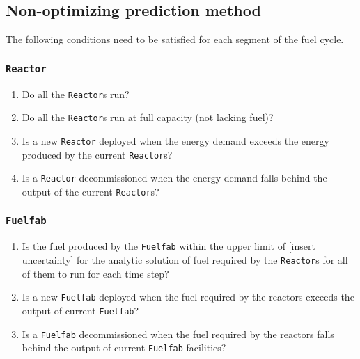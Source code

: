 \documentclass[12pt,letterpaper]{article}
\begin{document}
\subsection{Non-optimizing prediction method}
The following conditions need to be satisfied for each segment of the fuel cycle. 

\subsubsection{\texttt{Reactor}}

\begin{enumerate}
 
\item Do all the \texttt{Reactor}s run? 
\item  Do all the \texttt{Reactor}s run at full capacity (not lacking fuel)? 

\item Is a new \texttt{Reactor} deployed when the energy demand exceeds the energy produced by the current \texttt{Reactor}s? 

\item Is a \texttt{Reactor} decommissioned when the energy demand falls behind the output of the current \texttt{Reactor}s? 

\end{enumerate}

\subsubsection{\texttt{Fuelfab}}
\begin{enumerate}
\item  Is the fuel produced by the \texttt{Fuelfab} within the upper limit of [insert uncertainty] for the analytic solution of fuel required by the \texttt{Reactor}s for all of them to run for each time step? 

\item Is a new \texttt{Fuelfab} deployed when the fuel required by the reactors exceeds the output of current \texttt{Fuelfab}?

\item Is a \texttt{Fuelfab} decommissioned when the fuel required by the reactors falls behind the output of current \texttt{Fuelfab} facilities?
\end{enumerate}
\end{document}
